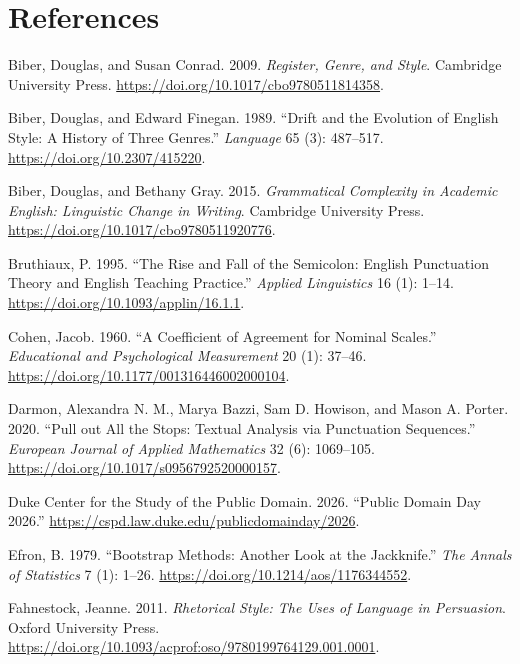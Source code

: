 \documentclass[
  11pt,
]{article}
\newlength{\cslhangindent}
\newenvironment{CSLReferences}[2] %
 {\begin{list}{}{%
  \setlength{\itemindent}{0pt}
  \setlength{\leftmargin}{0pt}
  \setlength{\parsep}{0pt}
  \ifodd #1
   \setlength{\leftmargin}{\cslhangindent}
   \setlength{\itemindent}{-1\cslhangindent}
  \fi
  \setlength{\itemsep}{#2\baselineskip}}}
 {\end{list}}
\begin{document}
\section*{References}\label{references}

\protect{}\label{refs}
\begin{CSLReferences}{1}{1}
Biber, Douglas, and Susan Conrad. 2009. \emph{Register, Genre, and Style}. Cambridge University Press. \url{https://doi.org/10.1017/cbo9780511814358}.

Biber, Douglas, and Edward Finegan. 1989. {``Drift and the Evolution of English Style: A History of Three Genres.''} \emph{Language} 65 (3): 487--517. \url{https://doi.org/10.2307/415220}.

Biber, Douglas, and Bethany Gray. 2015. \emph{Grammatical Complexity in Academic English: Linguistic Change in Writing}. Cambridge University Press. \url{https://doi.org/10.1017/cbo9780511920776}.

Bruthiaux, P. 1995. {``The Rise and Fall of the Semicolon: English Punctuation Theory and English Teaching Practice.''} \emph{Applied Linguistics} 16 (1): 1--14.
\url{https://doi.org/10.1093/applin/16.1.1}.

Cohen, Jacob. 1960. {``A Coefficient of Agreement for Nominal Scales.''} \emph{Educational and Psychological Measurement} 20 (1): 37--46. \url{https://doi.org/10.1177/001316446002000104}.

Darmon, Alexandra N. M., Marya Bazzi, Sam D. Howison, and Mason A. Porter. 2020. {``Pull out All the Stops: Textual Analysis via Punctuation Sequences.''} \emph{European Journal of Applied
Mathematics} 32 (6): 1069--105. \url{https://doi.org/10.1017/s0956792520000157}.

Duke Center for the Study of the Public Domain. 2026. {``Public Domain Day 2026.''} \url{https://cspd.law.duke.edu/publicdomainday/2026}.

Efron, B. 1979. {``Bootstrap Methods: Another Look at the Jackknife.''} \emph{The Annals of Statistics} 7 (1): 1--26. \url{https://doi.org/10.1214/aos/1176344552}.

Fahnestock, Jeanne. 2011. \emph{Rhetorical Style: The Uses of Language in Persuasion}. Oxford University Press. \url{https://doi.org/10.1093/acprof:oso/9780199764129.001.0001}.


\end{CSLReferences}
\end{document}

